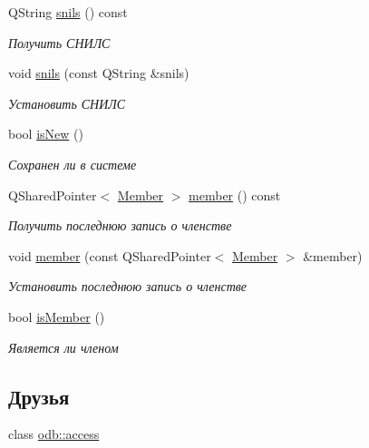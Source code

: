 \begin{DoxyCompactItemize}
Q\+String \hyperlink{classkpk_1_1data_1_1_person_ab97dd46a638436924b55be08e40fbd58}{snils} () const 
\begin{DoxyCompactList}\small\item\em Получить СНИЛС \end{DoxyCompactList}\item 
void \hyperlink{classkpk_1_1data_1_1_person_a110fad1e7ae404890ba536f6673f0d72}{snils} (const Q\+String \&snils)
\begin{DoxyCompactList}\small\item\em Установить СНИЛС \end{DoxyCompactList}\item 
bool \hyperlink{classkpk_1_1data_1_1_person_a102c06e6a83c60a46738fbbb46802b3b}{is\+New} ()
\begin{DoxyCompactList}\small\item\em Сохранен ли в системе \end{DoxyCompactList}\item 
Q\+Shared\+Pointer$<$ \hyperlink{classkpk_1_1data_1_1_member}{Member} $>$ \hyperlink{classkpk_1_1data_1_1_person_ae690eb327e9dc0c3ab781904889912ad}{member} () const 
\begin{DoxyCompactList}\small\item\em Получить последнюю запись о членстве \end{DoxyCompactList}\item 
void \hyperlink{classkpk_1_1data_1_1_person_a4357fd5288be372736f5e81bfe0b5f2f}{member} (const Q\+Shared\+Pointer$<$ \hyperlink{classkpk_1_1data_1_1_member}{Member} $>$ \&member)
\begin{DoxyCompactList}\small\item\em Установить последнюю запись о членстве \end{DoxyCompactList}\item 
bool \hyperlink{classkpk_1_1data_1_1_person_ab437e28e5004a3961c14c650fc99ee69}{is\+Member} ()
\begin{DoxyCompactList}\small\item\em Является ли членом \end{DoxyCompactList}\end{DoxyCompactItemize}
\subsection*{Друзья}
\begin{DoxyCompactItemize}
\item 
class \hyperlink{classkpk_1_1data_1_1_person_acb4d953abf85ae525f1d06a0c3a86a55}{odb\+::access}
\end{DoxyCompactItemize}


